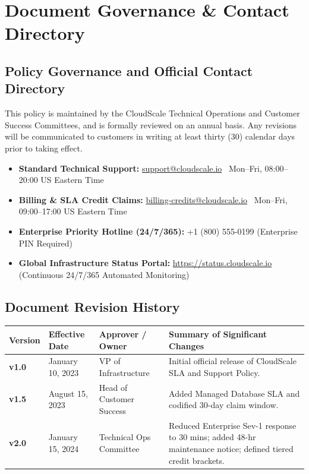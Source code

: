 \documentclass[10pt,letterpaper]{article}
\begin{document}
\section{Document Governance \& Contact Directory}

\subsection{Policy Governance and Official Contact Directory}
This policy is maintained by the CloudScale Technical Operations and Customer Success Committees, and is formally reviewed on an annual basis. Any revisions will be communicated to customers in writing at least thirty (30) calendar days prior to taking effect.
\begin{itemize}[leftmargin=1.5em, itemsep=0.5pt, topsep=1pt]
  \item \textbf{Standard Technical Support:} \url{support@cloudscale.io} \textbar\ Mon--Fri, 08:00--20:00 US Eastern Time
  \item \textbf{Billing \& SLA Credit Claims:} \url{billing-credits@cloudscale.io} \textbar\ Mon--Fri, 09:00--17:00 US Eastern Time
  \item \textbf{Enterprise Priority Hotline (24/7/365):} +1 (800) 555-0199 (Enterprise PIN Required)
  \item \textbf{Global Infrastructure Status Portal:} \url{https://status.cloudscale.io} (Continuous 24/7/365 Automated Monitoring)
\end{itemize}

\subsection{Document Revision History}
\vspace{1pt}
{\centering
\small
\renewcommand{\arraystretch}{1.08}
\begin{tabularx}{\linewidth}{@{}l l p{3.2cm} X@{}}
\toprule
\rowcolor{tablehead}
\color{white}\textbf{Version} & \color{white}\textbf{Effective Date} & \color{white}\textbf{Approver / Owner} & \color{white}\textbf{Summary of Significant Changes} \\
\midrule
\rowcolor{rowalt}
\textbf{v1.0} & January 10, 2023 & VP of Infrastructure & Initial official release of CloudScale SLA and Support Policy. \\
\textbf{v1.5} & August 15, 2023 & Head of Customer Success & Added Managed Database SLA and codified 30-day claim window. \\
\rowcolor{rowalt}
\textbf{v2.0} & January 15, 2024 & Technical Ops Committee & Reduced Enterprise Sev-1 response to 30 mins; added 48-hr maintenance notice; defined tiered credit brackets. \\
\bottomrule
\end{tabularx}
\label{tab:revision-history}
\par}
\end{document}

